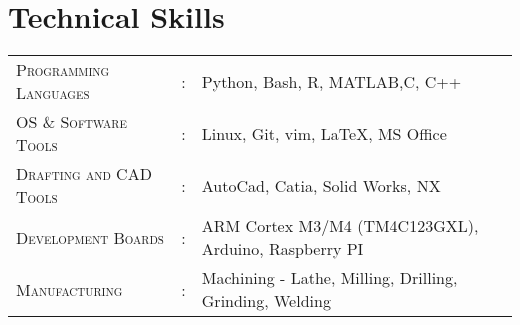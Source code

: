 \documentclass[letterpaper,10pt]{article}
\begin{document}
\section{Technical Skills}
\begin{tabular}{l c l}
	\textsc{Programming Languages}&:& Python, Bash, R, MATLAB,C, C++ \\
	\textsc{OS \& Software Tools}&:& Linux, Git, vim, \LaTeX, MS Office\\
    \textsc{Drafting and CAD Tools}&:& AutoCad, Catia, Solid Works, NX\\
    \textsc{Development Boards}&:& ARM Cortex M3/M4 (TM4C123GXL), Arduino, Raspberry PI\\
	\textsc{Manufacturing}&:& Machining - Lathe, Milling, Drilling, Grinding,
	Welding\\
\end{tabular}
\end{document}

